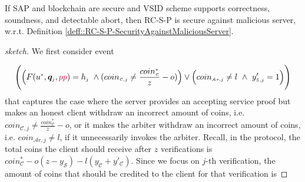 
 \begin{lemma}
 If SAP and blockchain are secure and  VSID scheme supports correctness, soundness, and detectable abort, then RC-S-P is secure against malicious server, w.r.t. Definition \ref{deff::RC-S-P-SecurityAgainstMaliciousServer}. 
 \end{lemma}
 

 \begin{proof}[sketch]
 We first consider event  
 
  $$\Bigg(\Big(F(u^{\scriptscriptstyle *}, \bm{q}_{\scriptscriptstyle j},\textcolor{purple}{pp})= h_{\scriptscriptstyle j}\ \wedge (coin_{\scriptscriptstyle\mathcal{C},j}\neq  \frac{coin_{\scriptscriptstyle\mathcal C}^{\scriptscriptstyle*}}{z}-o)\Big)  \vee\Big(coin_{\scriptscriptstyle\mathcal{A}r,j}\neq l\ \wedge\  y'_{\scriptscriptstyle \mathcal {S},j}=1\Big)\Bigg)$$
   that captures the case where the server provides an accepting service proof but makes an honest client withdraw an incorrect amount of coins, i.e. $coin_{\scriptscriptstyle\mathcal{C},j}\neq  \frac{coin_{\scriptscriptstyle\mathcal C}^{\scriptscriptstyle*}}{z}-o$, or it makes the arbiter withdraw an incorrect amount of coins, i.e. $coin_{\scriptscriptstyle\mathcal{A}r,j}\neq l$, if it unnecessarily invokes the arbiter. Recall, in the protocol, the total coins the client should receive after $z$ verifications is $coin^{\scriptscriptstyle *}_{\scriptscriptstyle\mathcal C}-o(z-y_{\scriptscriptstyle\mathcal S})-l (y_{\scriptscriptstyle\mathcal C}+y'_{\scriptscriptstyle\mathcal C})$. Since we focus on  $j$-th verification, the amount of  coins that should be credited to the client for that verification is
 
 
% 
  

\end{proof}
